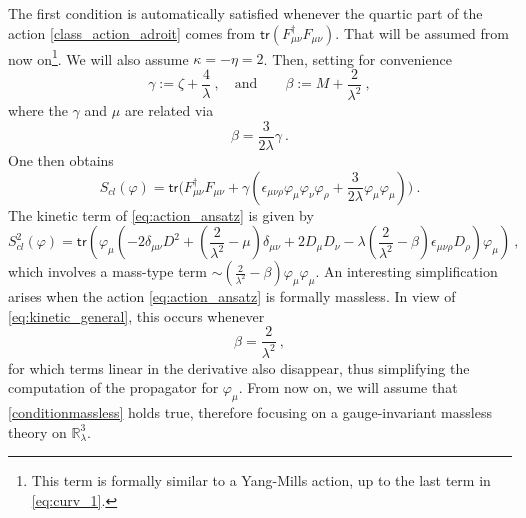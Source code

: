 \documentclass[11pt]{book}
\newcommand{\tr}{\mathsf{tr}}
\theoremstyle{break}
\begin{document}
The first condition is automatically satisfied whenever the quartic part of the action \eqref{class_action_adroit} comes  from $\tr(F^\dag_{\mu\nu}F_{\mu\nu})$. That will be assumed from now on\footnote{This term is formally similar to a Yang-Mills action, up to the last term in \eqref{eq:curv_1}.}. We will also assume $\kappa = -\eta=2$. Then, setting for convenience 
%
\begin{equation*}
\gamma:=\zeta+\frac{4}{\lambda} \ , \quad \mbox{and} \qquad \beta:= M +\frac{2}{\lambda^2} \ ,
\end{equation*}
%
where the $\gamma$ and $\mu$ are related via
%
\begin{equation*}
\beta=\frac{3}{2\lambda}\gamma \ . 
\end{equation*}
%
One then obtains
%
\begin{equation*}
S_{cl}(\varphi) = \tr\bigg(F^\dag_{\mu\nu}F_{\mu\nu} + \gamma \left( \epsilon_{\mu\nu\rho} \varphi_\mu \varphi_\nu \varphi_\rho + \frac{3}{2 \lambda} \varphi_\mu \varphi_\mu \right) \bigg) \ .
\label{eq:action_ansatz}
\end{equation*}
%
The kinetic term of \eqref{eq:action_ansatz} is given by
%
\begin{equation}
S^2_{cl}(\varphi) = \tr\left( \varphi_\mu \left( - 2 \delta_{\mu\nu} D^2 + \left( \frac{2}{\lambda^2}-\mu\right) \delta_{\mu\nu} + 2 D_\mu D_\nu
- \lambda \left( \frac{2}{\lambda^2}-\beta\right) \epsilon_{\mu\nu\rho} D_\rho \right) \varphi_\mu \right) \ ,
\label{eq:kinetic_general}
\end{equation}
%
which involves a mass-type term $\sim(\frac{2}{\lambda^2}-\beta)\varphi_\mu \varphi_\mu$. An interesting simplification arises when the action \eqref{eq:action_ansatz} is formally massless. In view of \eqref{eq:kinetic_general}, this occurs whenever 
%
\begin{equation}
\beta = \frac{2}{\lambda^2} \ ,
\label{conditionmassless}
\end{equation}
%
for which terms linear in the derivative also disappear, thus   simplifying  the computation of the propagator for $\varphi_\mu$. From now on, we will assume that \eqref{conditionmassless} holds true, therefore focusing on a gauge-invariant massless  theory on $\mathbb{R}^3_\lambda$.\par 
\end{document}
